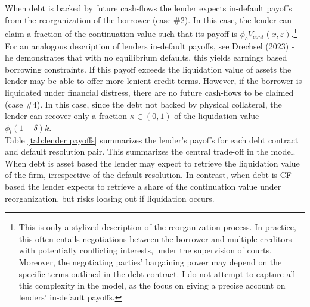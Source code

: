 \documentclass[12pt]{article}
\begin{document}
When debt is backed by future cash-flows the lender expects in-default payoffs from the reorganization of the borrower (case \#2). In this case, the lender can claim a fraction of the continuation value such that its payoff is $\phi_c V_{cont}(x,\varepsilon)$.\footnote{This is only a stylized description of the reorganization process. In practice, this often entails negotiations between the borrower and multiple creditors with potentially conflicting interests, under the supervision of courts. Moreover, the negotiating parties' bargaining power may depend on the specific terms outlined in the debt contract. I do not attempt to capture all this complexity in the model, as the focus on giving a precise account on lenders' in-default payoffs.} For an analogous description of lenders in-default payoffs, see Drechsel (2023) - he demonstrates that with no equilibrium defaults, this yields earnings based borrowing constraints. If this payoff exceeds the liquidation value of assets the lender may be able to offer more lenient credit terms. However, if the borrower is liquidated under financial distress, there are no future cash-flows to be claimed (case \#4). In this case, since the debt not backed by physical collateral, the lender can recover only a fraction $\kappa \in (0,1)$ of the liquidation value $ \phi_l(1-\delta)k$. \vspace{3mm} \\
Table \ref{tab:lender payoffs} summarizes the lender's payoffs for each debt contract and default resolution pair. This summarizes the central trade-off in the model. When debt is asset based the lender may expect to retrieve the liquidation value of the firm, irrespective of the default resolution. In contrast, when debt is CF-based the lender expects to retrieve a share of the continuation value under reorganization, but risks loosing out if liquidation occurs.
\end{document}
